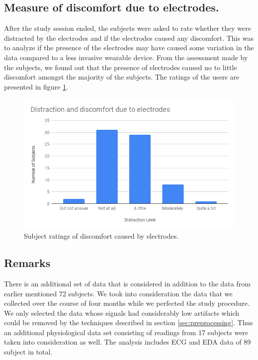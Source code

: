 \subsection{Measure of discomfort due to electrodes.}
After the study session ended, the subjects were asked to rate whether they were distracted by the electrodes and if the electrodes caused any discomfort. This was to analyze if the presence of the electrodes may have caused some variation in the data compared to a less invasive wearable device. From the assessment made by the subjects, we found out that the presence of electrodes caused no to little discomfort amongst the majority of the subjects. The ratings of the users are presented in figure \ref{fig:discomfort}.

\begin{figure}
    \centering
    \includegraphics[width=140mm]{Figures/distraction_and_discomfort.png}
    \caption{Subject ratings of discomfort caused by electrodes.}
    \label{fig:discomfort}
\end{figure}

\subsection{Remarks}
There is an additional set of data that is considered in addition to the data from earlier mentioned 72 subjects. We took into consideration the data that we collected over the course of four months while we perfected the study procedure. We only selected the data whose signals had considerably low artifacts which could be removed by the techniques described in section \ref{sec:preprocessing}. Thus an additional physiological data set consisting of readings from 17 subjects were taken into consideration as well. The analysis includes ECG and EDA data of 89 subject in total.

